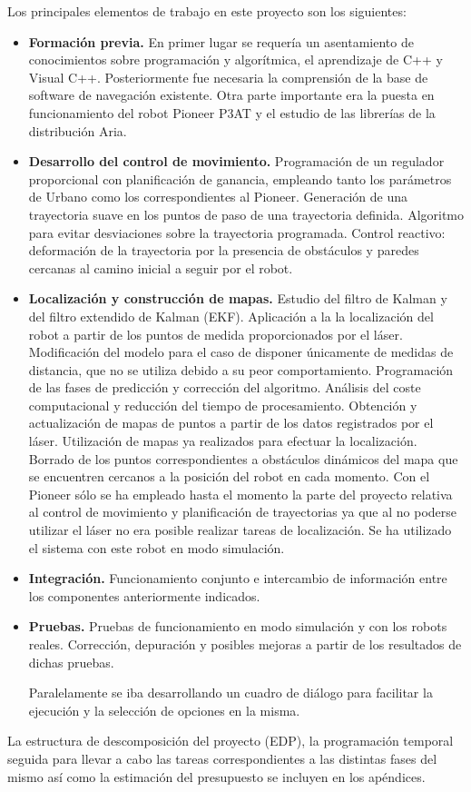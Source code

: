 Los principales elementos de trabajo en este proyecto son los siguientes:
\begin{itemize}
  \item \textbf{Formación previa.} En primer lugar se requería un asentamiento de conocimientos sobre programación y algorítmica, el aprendizaje de C++ y Visual C++. Posteriormente fue necesaria la comprensión de la base de software de navegación existente. Otra parte importante era la puesta en funcionamiento del robot Pioneer P3AT y el estudio de las librerías de la distribución Aria.
  \item \textbf{Desarrollo del control de movimiento.} Programación de un regulador proporcional con planificación de ganancia, empleando tanto los parámetros de Urbano como los correspondientes al Pioneer. Generación de una trayectoria suave en los puntos de paso de una trayectoria definida. Algoritmo para evitar desviaciones sobre la trayectoria programada. Control reactivo: deformación de la trayectoria por la presencia de obstáculos y paredes cercanas al camino inicial a seguir por el robot.
  \item \textbf{Localización y construcción de mapas.} Estudio del filtro de Kalman y del filtro extendido de Kalman (EKF). Aplicación a la la localización del robot a partir de los puntos de medida proporcionados por el láser. Modificación del modelo para el caso de disponer únicamente de medidas de distancia, que no se utiliza debido a su peor comportamiento. Programación de las fases de predicción y corrección del algoritmo. Análisis del coste computacional y reducción del tiempo de procesamiento. Obtención y actualización de mapas de puntos a partir de los datos registrados por el láser. Utilización de mapas ya realizados para efectuar la localización. Borrado de los puntos correspondientes a obstáculos dinámicos del mapa que se encuentren cercanos a la posición del robot en cada momento.
      Con el Pioneer sólo se ha empleado hasta el momento la parte del proyecto relativa al control de movimiento y planificación de trayectorias ya que al no poderse utilizar el láser no era posible realizar tareas de localización. Se ha utilizado el sistema con este robot en modo simulación.
  \item \textbf{Integración.} Funcionamiento conjunto e intercambio de información entre los componentes anteriormente indicados.
  \item \textbf{Pruebas.} Pruebas de funcionamiento en modo simulación y con los robots reales. Corrección, depuración y posibles mejoras a partir de los resultados de dichas pruebas.

  Paralelamente se iba desarrollando un cuadro de diálogo para facilitar la ejecución y la selección de opciones en la misma.
\end{itemize}

La estructura de descomposición del proyecto (EDP), la programación temporal seguida para llevar a cabo las tareas correspondientes a las distintas fases del mismo así como la estimación del presupuesto se incluyen en los apéndices.




